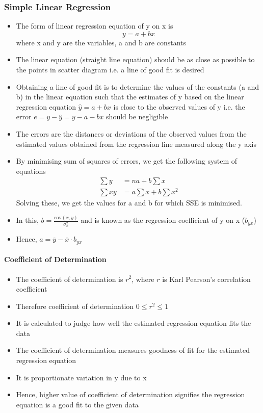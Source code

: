 \documentclass[
10pt, %
a4paper, %
]{report}
\begin{document}
\subsubsection{Simple Linear Regression}
\begin{itemize}
\item The form of linear regression equation of y on x is
\[ y = a+bx\]
where x and y are the variables, a and b are constants
\item The linear equation (straight line equation) should be as close as possible to the points in scatter diagram i.e. a line of good fit is desired
\item Obtaining a line of good fit is to determine the values of the constants (a and b) in the linear equation such that the estimates of y based on the linear regression equation \(\hat{y} = a+bx\) is close to the observed values of y i.e. the error \(e = y - \hat{y} = y - a - bx\) should be negligible
\item The errors are the distances or deviations of the observed values from the estimated values obtained from the regression line measured along the y axis
\item By minimising sum of squares of errors, we get the following system of equations
\begin{align*}
\sum y &= na + b \sum x \\
\sum xy &= a\sum x + b \sum x^2
\end{align*}
Solving these, we get the values for a and b for which SSE is minimised.
\item In this, \(b = \frac{\mathrm{cov}(x, y)}{\sigma_x^2}\) and is known as the regression coefficient of y on x (\(b_{yx}\))
\item Hence, \(a = \overline{y} - \overline{x} \cdot b_{yx}\)
\end{itemize}

\paragraph*{Coefficient of Determination}

\begin{itemize}
\item The coefficient of determination is \(r^2\), where \(r\) is Karl Pearson’s correlation coefficient
\item Therefore coefficient of determination \(0 \le r^2 \le 1\)
\item It is calculated to judge how well the estimated regression equation fits the data
\item The coefficient of determination measures goodness of fit for the estimated regression equation
\item It is proportionate variation in y due to x
\item Hence, higher value of coefficient of determination signifies the regression equation is a good fit to the given data
\end{itemize}
\end{document}
